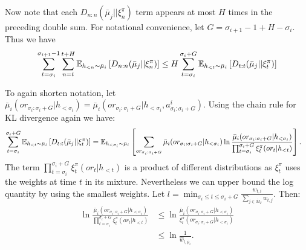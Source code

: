     \Line
    
    Now note that each $D_{n:n}(\bar{\mu}_j || \xi^{\pi}_n)$ term appears at most $H$ times in the preceding double sum. For notational convenience, let $G = \sigma_{i+1}-1 + H - \sigma_i$.
    Thus we have
    \begin{align*}
        \sum_{t=\sigma_i}^{\sigma_{i+1}-1} \sum_{n=t}^{t+H} \mathbb{E}_{h_{<n} \sim \bar{\mu}_i} \left[ D_{n:n}(\bar{\mu}_j || \xi_n^{\pi}) \right] &\leq
        H \sum_{t=\sigma_i}^{\sigma_i + G} \mathbb{E}_{h_{<t} \sim \bar{\mu}_i} \left[ D_{t:t}(\bar{\mu}_j || \xi_t^{\pi}) \right]\\
    \end{align*}

    To again shorten notation, let $\bar{\mu}_i(or_{\sigma_i: \sigma_i+G} | h_{<\sigma_i}) = \bar{\mu}_i(or_{\sigma_i: \sigma_i+G} | h_{<\sigma_i}, a^{i}_{\sigma_i: \sigma_i+G})$. Using the chain rule for KL divergence again we have:
    \begin{align}
        \sum_{t=\sigma_i}^{\sigma_i + G} \mathbb{E}_{h_{<t} \sim \bar{\mu}_i} \left[ D_{t:t}(\bar{\mu}_j || \xi_t^{\pi}) \right]
        &= \mathbb{E}_{h_{<\sigma_i} \sim \bar{\mu}_i} \left[ \sum_{or_{\sigma_i: \sigma_i+G}} \bar{\mu}_i(or_{\sigma_i: \sigma_i+G} | h_{<\sigma_i}) \ln \frac{\bar{\mu}_i(or_{\sigma_i: \sigma_i+G} | h_{<\sigma_i})}{\prod_{t = \sigma_i}^{\sigma_i+G} \xi^{\pi}_t(or_t | h_{<t})} \right]. \label{eqn:5}
    \end{align}
    The term $\prod_{t = \sigma_i}^{\sigma_i+G} \xi^{\pi}_t(or_t | h_{<t})$ is a product of different distributions as $\xi^{\pi}_t$ uses the weights at time $t$ in its mixture. Nevertheless we can upper bound the log quantity by using the smallest weights. Let $l = \min_{\sigma_i \leq t \leq \sigma_i + G} \frac{w_{t, i}}{\sum_{j \in \bar{M}_T} w_{t, j}}$. Then:
    \begin{align*}
        \ln \frac{\bar{\mu}_i(or_{\sigma_i: \sigma_i+G} | h_{<\sigma_i})}{\prod_{t = \sigma_i}^{\sigma_i+G} \xi^{\pi}_t(or_t | h_{<t})} &\leq \ln \frac{\bar{\mu}_i(or_{\sigma_i: \sigma_i+G} | h_{<\sigma_i})}{\xi^{\pi}_{l}(or_{\sigma_{i}:\sigma_{i}+G} | h_{<\sigma_i}) }\\
        &\leq \ln \frac{ 1 }{ \hat{w}_{l, \bar{\mu}_i} }.
    \end{align*}

